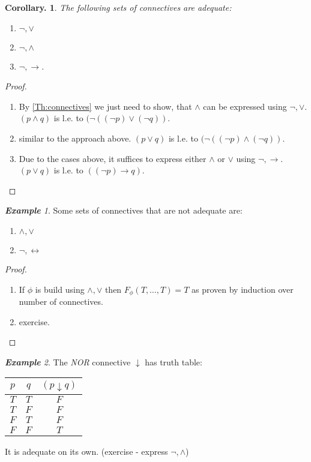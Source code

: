 \documentclass[a4paper,oneside,11pt,DIV=12,parskip=half]{scrartcl}
\theoremstyle{plain}
\newtheorem{corollary}[theorem]{Corollary.}
\theoremstyle{definition}
\newtheorem{remark, definition}[theorem]{Remark and Definition.}
\newtheorem{lemma, definition}[theorem]{Lemma and Definition.}
\newtheorem{theorem, definition}[theorem]{Theorem and Definition.}
\theoremstyle{remark}
\newtheorem*{example}{\textbf{Example}}
\newtheorem*{remark, example}{\textbf{Remark and Exercise}}
\begin{document}
\begin{corollary}
The following sets of connectives are adequate:
\begin{enumerate}
    \item $\lnot, \lor$
    \item $\lnot, \land$
    \item $\lnot, \rightarrow$.
\end{enumerate}
\end{corollary}

\begin{proof}
\begin{enumerate}
    \item By \ref{Th:connectives} we just need to show, that $\land$ can be expressed using $\lnot,\lor$. $(p \land q)$ is l.e. to $(\lnot((\lnot p) \lor (\lnot q))$.
    \item similar to the approach above. $(p \lor q)$ is l.e. to $(\lnot((\lnot p) \land (\lnot q))$.
    \item Due to the cases above, it suffices to express either $\land$ or $\lor$ using $\lnot,\rightarrow$. $(p \lor q)$ is l.e. to $((\lnot p) \rightarrow  q)$.
\end{enumerate}
\end{proof}

\begin{example}

Some sets of connectives that are not adequate are:
\begin{enumerate}
    \item $\land, \lor$
    \item $\lnot,\leftrightarrow$
\end{enumerate}
\begin{proof}
\begin{enumerate}
    \item If $\phi$ is build using $\land,\lor$ then 
    $F_\phi(T,\dots,T) = T$ as proven by induction over number of connectives.
    \item exercise.
\end{enumerate}
\end{proof}
\end{example}

\begin{example}
The \emph{NOR} connective $\downarrow$ has truth table:
    \begin{tabular}{c|c|c}
        $p$ & $q$ & $(p \downarrow q)$ \\
        \hline
        $T$ & $T$ & $F$ \\ 
        $T$ & $F$ & $F$ \\
        $F$ & $T$ & $F$ \\
        $F$ & $F$ & $T$ \\
        
    \end{tabular}
    It is adequate on its own. (exercise - express $\lnot, \land$)
\end{example}
\end{document}
